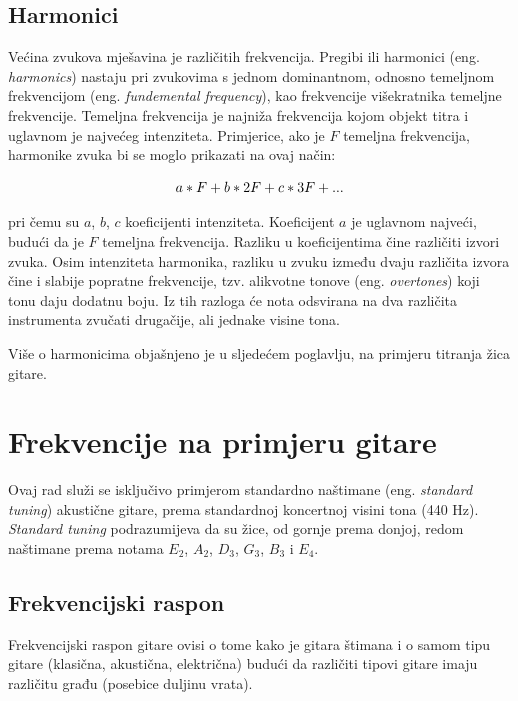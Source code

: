 \documentclass[times, utf8, zavrsni, numeric]{fer}
\begin{document}
\section{Harmonici}
Većina zvukova mješavina je različitih frekvencija. Pregibi ili harmonici (eng. \textit{harmonics}) nastaju pri zvukovima s jednom dominantnom, odnosno temeljnom frekvencijom (eng. \textit{fundemental frequency}), kao frekvencije višekratnika temeljne frekvencije.\cite{sethares2005tuning} Temeljna frekvencija je najniža frekvencija kojom objekt titra i uglavnom je najvećeg intenziteta.\cite{teachmeaudio2020} Primjerice, ako je $F$ temeljna frekvencija, harmonike zvuka bi se moglo prikazati na ovaj način:

\begin{equation}
	a*F + b*2F + c*3F + ...\\
\end{equation}

pri čemu su $a$, $b$, $c$ koeficijenti intenziteta. Koeficijent $a$ je uglavnom najveći, budući da je $F$ temeljna frekvencija. Razliku u koeficijentima čine različiti izvori zvuka. Osim intenziteta harmonika, razliku u zvuku između dvaju različita izvora čine i slabije popratne frekvencije, tzv. alikvotne tonove (eng. \textit{overtones}) koji tonu daju dodatnu boju.\cite{christensen1987science} Iz tih razloga će nota odsvirana na dva različita instrumenta zvučati drugačije, ali jednake visine tona.

Više o harmonicima objašnjeno je u sljedećem poglavlju, na primjeru titranja žica gitare.

%

\chapter{Frekvencije na primjeru gitare}
Ovaj rad služi se isključivo primjerom standardno naštimane (eng. \textit{standard tuning}) akustične gitare, prema standardnoj koncertnoj visini tona (440 Hz). \textit{Standard tuning} podrazumijeva da su žice, od gornje prema donjoj, redom naštimane prema notama $E_2$, $A_2$, $D_3$, $G_3$, $B_3$ i $E_4$.

\section{Frekvencijski raspon}
Frekvencijski raspon gitare ovisi o tome kako je gitara štimana i o samom tipu gitare (klasična, akustična, električna) budući da različiti tipovi gitare imaju različitu građu (posebice duljinu vrata).
\end{document}
